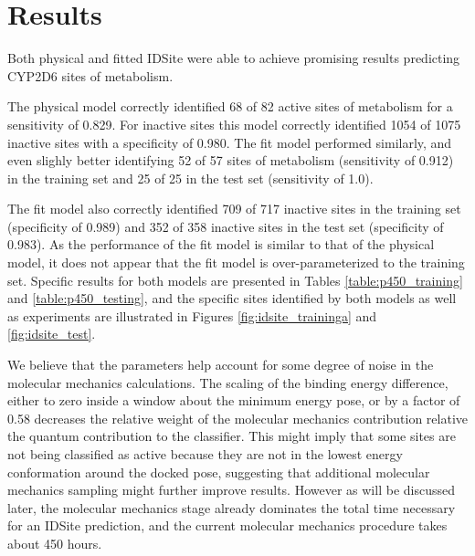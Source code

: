 \section{Results}
\label{section:p450/results}
Both physical and fitted IDSite were able to achieve promising results predicting CYP2D6 sites of metabolism.

The physical model correctly identified 68 of 82 active sites of metabolism for a sensitivity of 0.829.
For inactive sites this model correctly identified 1054 of 1075 inactive sites with a specificity of 0.980.
The fit model performed similarly, and even slighly better identifying 52 of 57 sites of metabolism (sensitivity of 0.912) in the training set and 25 of 25 in the test set (sensitivity of 1.0).




The fit model also correctly identified 709 of 717 inactive sites in the training set (specificity of 0.989) and 352 of 358 inactive sites in the test set (specificity of 0.983).
As the performance of the fit model is similar to that of the physical model, it does not appear that the fit model is over-parameterized to the training set.
Specific results for both models are presented in Tables \ref{table:p450_training} and \ref{table:p450_testing}, and the specific sites identified by both models as well as experiments are illustrated in Figures \ref{fig:idsite_traininga} and \ref{fig:idsite_test}. 

We believe that the parameters help account for some degree of noise in the molecular mechanics calculations.
The scaling of the binding energy difference, either to zero inside a window about the minimum energy pose, or by a factor of 0.58 decreases the relative weight of the molecular mechanics contribution relative the quantum contribution to the classifier.
This might imply that some sites are not being classified as active because they are not in the lowest energy conformation around the docked pose, suggesting that additional molecular mechanics sampling might further improve results.
However as will be discussed later, the molecular mechanics stage already dominates the total time necessary for an IDSite prediction, and the current molecular mechanics procedure takes about 450 hours.




